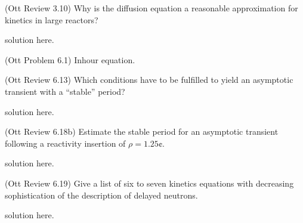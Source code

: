 \documentclass[11pt,addpoints,answers]{exam}
\begin{document}
\begin{questions}
        \question[10] (Ott Review 3.10) Why is the diffusion equation a reasonable 
        approximation for kinetics in large reactors?
        \begin{solution}
                solution here.
        \end{solution}

        

        \question (Ott Problem 6.1) Inhour equation.

        \question[5] (Ott Review 6.13) Which conditions have to be fulfilled to 
        yield an asymptotic transient with a ``stable'' period?
        \begin{solution}
                solution here.
        \end{solution}

        
        \question[10] (Ott Review 6.18b) Estimate the stable period for an 
        asymptotic transient following a reactivity insertion of $\rho = 
        1.25\cent$.
        \begin{solution}
                solution here.
        \end{solution}


        \question[15] (Ott Review 6.19) Give a list of six to seven 
        kinetics equations with decreasing sophistication of the description of 
        delayed neutrons.
        \begin{solution}
                solution here.
        \end{solution}
        
\end{questions}



%
%
\end{document}
